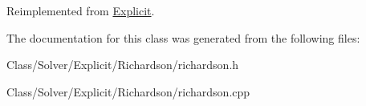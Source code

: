 Reimplemented from \hyperlink{class_explicit_ac99aa17bfd95f66b33e5c0ecf0e53785}{Explicit}.



The documentation for this class was generated from the following files\+:\begin{DoxyCompactItemize}
\item 
Class/\+Solver/\+Explicit/\+Richardson/richardson.\+h\item 
Class/\+Solver/\+Explicit/\+Richardson/richardson.\+cpp\end{DoxyCompactItemize}
